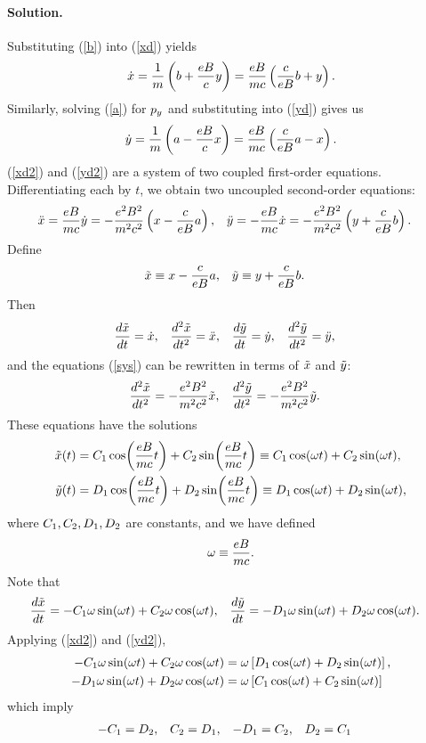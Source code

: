\documentclass[11pt]{article}
\newcommand{\refeq}[1]{(\ref{#1})}
\newcommand{\beq}{\begin{equation*}}
\newcommand{\eeq}{\end{equation*}}
\newcommand{\beqn}{\begin{equation}}
\newcommand{\eeqn}{\end{equation}}
\newenvironment{solution}
{
    \paragraph{Solution.}
    \ignorespaces
}
{
    \bigskip
}
\begin{document}
\begin{solution}
	Substituting \refeq{b} into \refeq{xd} yields
	\beqn \label{xd2}
		\xd = \frac{1}{m} \left( b + \frac{e B}{c} y \right)
		= \frac{e B}{m c} \left( \frac{c}{e B} b + y \right).
	\eeqn
	Similarly, solving \refeq{a} for $p_y$ and substituting into \refeq{yd} gives us
	\beqn \label{yd2}
		\yd = \frac{1}{m} \left( a - \frac{e B}{c} x \right)
		= \frac{e B}{m c} \left( \frac{c}{e B} a - x \right).
	\eeqn
	\refeq{xd2} and \refeq{yd2} are a system of two coupled first-order equations.  Differentiating each by $t$, we obtain two uncoupled second-order equations:
	\begin{align} \label{sys}
		\ddot{x} &= \frac{e B}{m c} \dot{y}
		= -\frac{e^2 B^2}{m^2 c^2} \left( x - \frac{c}{e B} a \right), &
		\ddot{y} &= -\frac{e B}{m c} \dot{x}
		= -\frac{e^2 B^2}{m^2 c^2} \left( y + \frac{c}{e B} b \right).
	\end{align}
	Define
	\begin{align*}
		\tilde{x} &\equiv x - \frac{c}{e B} a, &
		\tilde{y} &\equiv y + \frac{c}{e B} b.
	\end{align*}
	Then
	\begin{align*}
		\dv{\tilde{x}}{t} &= \dot{x}, &
		\dv[2]{\tilde{x}}{t} &= \ddot{x}, &
		\dv{\tilde{y}}{t} &= \dot{y}, &
		\dv[2]{\tilde{y}}{t} &= \ddot{y},
	\end{align*}
	and the equations \refeq{sys} can be rewritten in terms of $\tilde{x}$ and $\tilde{y}$:
	\begin{align*}
		\dv[2]{\tilde{x}}{t} &= -\frac{e^2 B^2}{m^2 c^2} \tilde{x}, &
		\dv[2]{\tilde{y}}{t} &= -\frac{e^2 B^2}{m^2 c^2} \tilde{y}.
	\end{align*}
	These equations have the solutions
	\begin{align*}
		\tilde{x}(t) &= C_1 \cos(\frac{e B}{m c} t) + C_2 \sin(\frac{e B}{m c} t)
		\equiv C_1 \cos(\omega t) + C_2 \sin(\omega t), \\
		\tilde{y}(t) &= D_1 \cos(\frac{e B}{m c} t) + D_2 \sin(\frac{e B}{m c} t)
		\equiv D_1 \cos(\omega t) + D_2 \sin(\omega t),
	\end{align*}
	where $C_1, C_2, D_1, D_2$ are constants, and we have defined
	\beq
		\omg \equiv \frac{e B}{m c}.
	\eeq
	Note that
	\begin{align*}
		\dv{\tilde{x}}{t} &= -C_1 \omega \sin(\omega t) + C_2 \omega \cos(\omega t), &
		\dv{\tilde{y}}{t} &= -D_1 \omega \sin(\omega t) + D_2 \omega \cos(\omega t).
	\end{align*}
	Applying \refeq{xd2} and \refeq{yd2},
	\begin{align*}
		-C_1 \omega \sin(\omega t) + C_2 \omega \cos(\omega t) &= \omega \left[ D_1 \cos(\omega t) + D_2 \sin(\omega t) \right], \\
		-D_1 \omega \sin(\omega t) + D_2 \omega \cos(\omega t) &= \omega \left[ C_1 \cos(\omega t) + C_2 \sin(\omega t) \right]
	\end{align*}
	which imply
	\begin{align*}
		-C_1 &= D_2, &
		C_2 &= D_1, &
		-D_1 &= C_2, &
		D_2 &= C_1
	\end{align*}
	

\end{solution}
\end{document}
